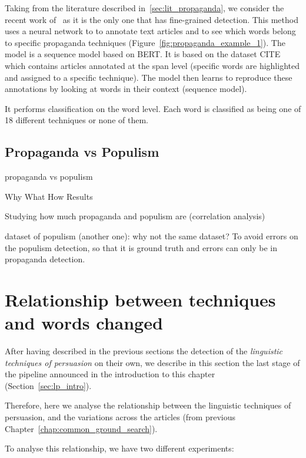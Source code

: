 Taking from the literature described in~\ref{sec:lit_propaganda}, we consider the recent work of~\cite{da2019fine} as it is the only one that has fine-grained detection. This method uses a neural network to to annotate text articles and to see which words belong to specific propaganda techniques (Figure~\ref{fig:propaganda_example_1}).
The model is a sequence model based on BERT. It is based on the dataset CITE which contains articles annotated at the span level (specific words are highlighted and assigned to a specific technique). The model then learns to reproduce these annotations by looking at words in their context (sequence model).

It performs classification on the word level. Each word is classified as being one of 18 different techniques or none of them.



\subsection{\statusred Propaganda vs Populism}

propaganda vs populism

Why
What
How
Results

Studying how much propaganda and populism are (correlation analysis)

dataset of populism (another one): why not the same dataset? To avoid errors on the populism detection, so that it is ground truth and errors can only be in propaganda detection.


\section{Relationship between techniques and words changed}
\label{sec:lp_relationship}

After having described in the previous sections the detection of the \emph{linguistic techniques of persuasion} on their own, we describe in this section the last stage of the pipeline announced in the introduction to this chapter (Section~\ref{sec:lp_intro}).

Therefore, here we analyse the relationship between the linguistic techniques of persuasion, and the variations across the articles (from previous Chapter~\ref{chap:common_ground_search}).

To analyse this relationship, we have two different experiments:

